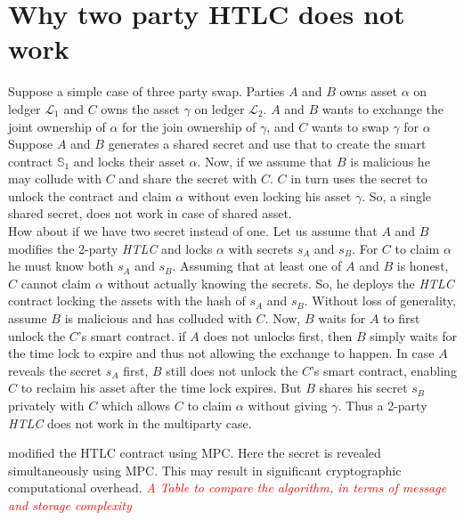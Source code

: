 \documentclass[manuscript,screen,review]{acmart}
\newcommand{\com}[1]{\textcolor{red}{\textit{#1}}}
\begin{document}
\section{Why two party HTLC does not work}
Suppose a simple case of three party swap. Parties $A$ and $B$ owns asset $\alpha$ on ledger $\mathcal{L}_1$ and $C$ owns the asset $\gamma$ on ledger $\mathcal{L}_2$. $A$ and $B$ wants to exchange the joint ownership of $\alpha$ for the join ownership of $\gamma$, and $C$ wants to swap $\gamma$ for $\alpha$
Suppose $A$ and $B$ generates a shared secret and use that to create the smart contract $\mathbb{S}_1$ and locks their asset $\alpha$. Now, if we assume that $B$ is malicious he may collude with $C$ and share the secret with $C$. $C$ in turn uses the secret to unlock the contract and claim $\alpha$ without even locking his asset $\gamma$. So, a single shared secret, does not work in case of shared asset.\\
How about if we have two secret instead of one. Let us assume that $A$ and $B$ modifies the 2-party \textit{HTLC} and locks $\alpha$ with secrets $s_A$ and $s_B$. For $C$ to claim $\alpha$ he must know both $s_A$ and $s_B$. Assuming that at least one of $A$ and $B$ is honest, $C$ cannot claim $\alpha$ without actually knowing the secrets. So, he deploys the \textit{HTLC} contract locking the assets with the hash of $s_A$ and $s_B$. Without loss of generality, assume $B$ is malicious and has colluded with $C$. Now, $B$ waits for $A$ to first unlock the $C$'s smart contract. if $A$ does not unlocks first, then $B$ simply waits for the time lock to expire and thus not allowing the exchange to happen. In case $A$ reveals the secret $s_A$ first, $B$ still does not unlock the $C$'s smart contract, enabling $C$ to reclaim his asset after the time lock expires. But $B$ shares his secret $s_B$ privately with $C$ which allows $C$ to claim $\alpha$ without giving $\gamma$. 
Thus a 2-party \textit{HTLC} does not work in the multiparty case.

\cite{ibm} modified the HTLC contract using MPC. Here the secret is revealed simultaneously using MPC. This may result in significant cryptographic computational overhead. 
\com{A Table to compare the algorithm, in terms of message and storage complexity}
\end{document}
